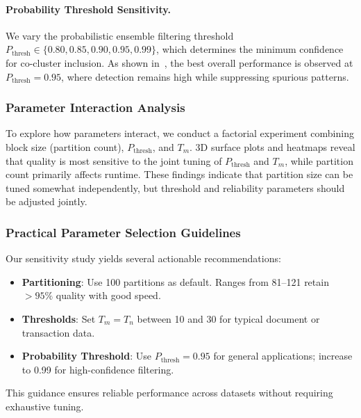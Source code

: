 \documentclass[journal]{IEEEtran}
\begin{document}
{        \paragraph{Probability Threshold Sensitivity.}
        We vary the probabilistic ensemble filtering threshold \( P_{\text{thresh}} \in \{0.80, 0.85, 0.90, 0.95, 0.99\} \), which determines the minimum confidence for co-cluster inclusion. As shown in~, the best overall performance is observed at \( P_{\text{thresh}} = 0.95 \), where detection remains high while suppressing spurious patterns.

        \subsubsection{Parameter Interaction Analysis}
        To explore how parameters interact, we conduct a factorial experiment combining block size (partition count), \( P_{\text{thresh}} \), and \( T_m \). 3D surface plots and heatmaps reveal that quality is most sensitive to the joint tuning of \( P_{\text{thresh}} \) and \( T_m \), while partition count primarily affects runtime. These findings indicate that partition size can be tuned somewhat independently, but threshold and reliability parameters should be adjusted jointly.

        \subsubsection{Practical Parameter Selection Guidelines}
        Our sensitivity study yields several actionable recommendations:
        \begin{itemize}
            \item \textbf{Partitioning}: Use 100 partitions as default. Ranges from 81–121 retain $>95\%$ quality with good speed.
            \item \textbf{Thresholds}: Set \( T_m = T_n \) between 10 and 30 for typical document or transaction data.
            \item \textbf{Probability Threshold}: Use \( P_{\text{thresh}} = 0.95 \) for general applications; increase to 0.99 for high-confidence filtering.
        \end{itemize}
        This guidance ensures reliable performance across datasets without requiring exhaustive tuning.
    }
\end{document}
